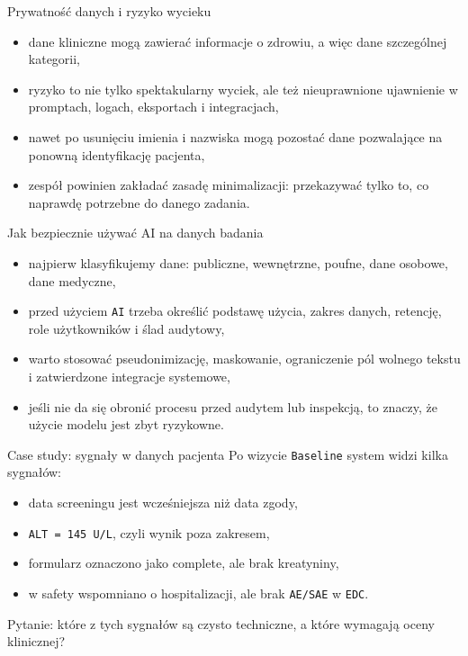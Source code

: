 \begin{frame}{Prywatność danych i ryzyko wycieku}
  \begin{itemize}
    \item dane kliniczne mogą zawierać informacje o zdrowiu, a więc dane szczególnej kategorii,
    \item ryzyko to nie tylko spektakularny wyciek, ale też nieuprawnione ujawnienie w promptach, logach, eksportach i integracjach,
    \item nawet po usunięciu imienia i nazwiska mogą pozostać dane pozwalające na ponowną identyfikację pacjenta,
    \item zespół powinien zakładać zasadę minimalizacji: przekazywać tylko to, co naprawdę potrzebne do danego zadania.
  \end{itemize}
\end{frame}

\begin{frame}{Jak bezpiecznie używać AI na danych badania}
  \begin{itemize}
    \item najpierw klasyfikujemy dane: publiczne, wewnętrzne, poufne, dane osobowe, dane medyczne,
    \item przed użyciem \texttt{AI} trzeba określić podstawę użycia, zakres danych, retencję, role użytkowników i ślad audytowy,
    \item warto stosować pseudonimizację, maskowanie, ograniczenie pól wolnego tekstu i zatwierdzone integracje systemowe,
    \item jeśli nie da się obronić procesu przed audytem lub inspekcją, to znaczy, że użycie modelu jest zbyt ryzykowne.
  \end{itemize}
\end{frame}

\begin{frame}{Case study: sygnały w danych pacjenta}
  Po wizycie \texttt{Baseline} system widzi kilka sygnałów:
  \begin{itemize}
    \item data screeningu jest wcześniejsza niż data zgody,
    \item \texttt{ALT = 145 U/L}, czyli wynik poza zakresem,
    \item formularz oznaczono jako complete, ale brak kreatyniny,
    \item w safety wspomniano o hospitalizacji, ale brak \texttt{AE/SAE} w \texttt{EDC}.
  \end{itemize}
  \vspace{0.2cm}
  Pytanie: które z tych sygnałów są czysto techniczne, a które wymagają oceny klinicznej?
\end{frame}

